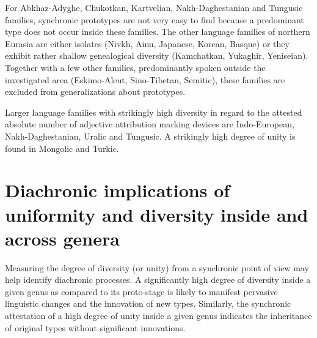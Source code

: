 For Abkhaz-Adyghe, Chukotkan, Kartvelian, Nakh-Daghestanian and Tungusic families, synchronic prototypes are not very easy to find because a predominant type does not occur inside these families. The other language families of northern Eurasia are either isolates (Nivkh, Ainu, Japanese, Korean, Basque) or they exhibit rather shallow genealogical diversity (Kamchatkan, Yukaghir, Yeniseian). Together with a few other families, predominantly spoken outside the investigated area (Eskimo-Aleut, Sino-Tibetan, Semitic), these families are excluded from generalizations about prototypes. 

Larger language families with strikingly high diversity in regard to the attested absolute number of adjective attribution marking devices are Indo-European, Nakh-Daghestanian, Uralic and Tungusic. A strikingly high degree of unity is found in Mongolic and Turkic.

\section[Diachronic implications]{Diachronic implications of uniformity and diversity inside and across genera}
Measuring the degree of diversity (or unity) from a synchronic point of view may help identify diachronic processes. A significantly high degree of diversity inside a given genus as compared to its proto-stage is likely to manifest pervasive linguistic changes and the innovation of new types. Similarly, the synchronic attestation of a high degree of unity inside a given genus indicates the inheritance of original types without significant innovations. 


